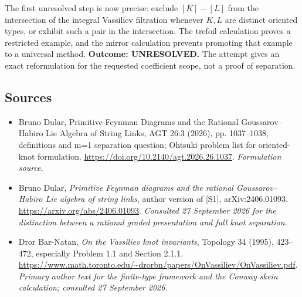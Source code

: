 \documentclass[11pt]{article}
\begin{document}
The first unresolved step is now precise: exclude $[K]-[L]$ from the
intersection of the integral Vassiliev filtration whenever $K,L$ are
distinct oriented types, or exhibit such a pair in the intersection.
The trefoil calculation proves a restricted example, and the mirror
calculation prevents promoting that example to a universal method.
\textbf{Outcome: UNRESOLVED.} The attempt gives an exact reformulation
for the requested coefficient scope, not a proof of separation.
\subsection{Sources}
\begin{itemize}
\item[S1]Bruno Dular, Primitive Feynman Diagrams and the Rational Goussarov–Habiro Lie Algebra of String Links, AGT 26:3 (2026), pp. 1037–1038, definitions and m=1 separation question; Ohtsuki problem list for oriented-knot formulation.
\url{https://doi.org/10.2140/agt.2026.26.1037}.
\textit{Formulation source.}
\item[E1]Bruno Dular, \emph{Primitive Feynman diagrams and the rational Goussarov--Habiro Lie algebra of string links}, author version of [S1], arXiv:2406.01093.
\url{https://arxiv.org/abs/2406.01093}.
\textit{Consulted 27 September 2026 for the distinction between a rational graded presentation and full knot separation.}
\item[E2]Dror Bar-Natan, \emph{On the Vassiliev knot invariants}, Topology 34 (1995), 423--472, especially Problem 1.1 and Section 2.1.1.
\url{https://www.math.toronto.edu/~drorbn/papers/OnVassiliev/OnVassiliev.pdf}.
\textit{Primary author text for the finite-type framework and the Conway skein calculation; consulted 27 September 2026.}
\end{itemize}
\end{document}
